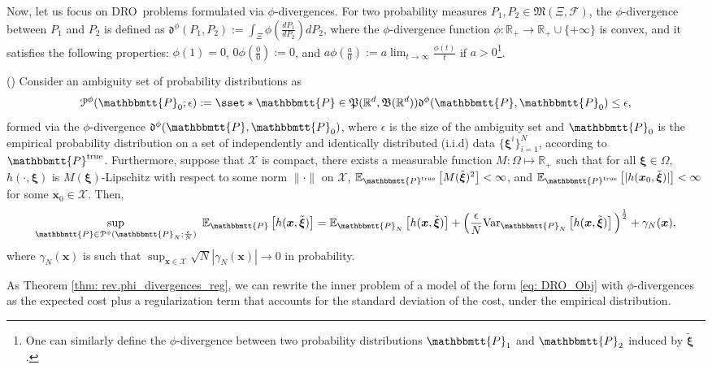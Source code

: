 \documentclass[final,onefignum,onetabnum]{class}
\newcommand{\ee}[2]{\mathbb{E}_{#1} \left[ #2 \right]}
\newcommand{\VVar}[2]{\mathrm{Var}_{#1} \left[ #2 \right]}
\newcommand{\bs}[1]{\boldsymbol{#1}} %
\newcommand{\Bs}[1]{\mathbb{#1}} %
\newcommand{\Ts}[1]{\mathbbmtt{#1}} %
\newcommand{\Cs}[1]{\mathcal{#1}} %
\newcommand{\Fs}[1]{\mathfrak{#1}} %
\newcommand{\txi}{\tilde{\bs{\xi}}}
\newcommand{\nomP}{\Ts{P}_{0}}
\newcommand{\trueP}{\Ts{P}^{\text{true}}}
\newcommand{\measurespace}{\left( \Xi, \Cs{F} \right)}
\renewcommand{\P}{\Fs{P}(\Bs{R}^{d},\Fs{B}(\Bs{R}^{d}))}
\newcommand{\dro}{DRO}
\begin{document}
Now, let us focus on \dro\ problems formulated via $\phi$-divergences. For two probability measures $P_{1}, P_{2} \in \Fs{M}\measurespace$, the $\phi$-divergence between $P_{1}$ and $P_{2}$ is defined as  $\Fs{d}^{\phi}(P_{1}, P_{2}):=\int_{\Xi}\phi\left(\frac{d P_{1}}{d P_{2}}\right) d P_{2}$, where the $\phi$-divergence function $\phi : \Bs{R}_{+} \rightarrow \Bs{R}_{+} \cup \{+ \infty\}$ is convex, and it satisfies the following properties: $\phi(1)=0$, $0\phi\left(\frac{0}{0}\right):=0$, and $a\phi\left(\frac{a}{0}\right):=a \lim_{t \rightarrow \infty} \frac{\phi(t)}{t}$ if $a>0$\footnote{One can similarly define the $\phi$-divergence between  two probability distributions $\Ts{P}_{1}$ and $\Ts{P}_{2}$ induced by $\txi$.}. 

\begin{theorem}{(\citet[Theorem~2]{duchi2016})}
     \label{thm: rev.phi_divergences_reg}
     Consider an ambiguity set of probability distributions as $$
        \Cs{P}^{\phi}(\nomP; \epsilon):= \sset*{\Ts{P} \in \P}{ \Fs{d}^{\phi}(\Ts{P},\nomP) \le \epsilon},$$
     formed via the $\phi$-divergence  $\Fs{d}^{\phi}(\Ts{P} ,\nomP)$, where $\epsilon$ is the size of the ambiguity set and $\nomP$ is the empirical probability distribution on a set of independently and identically distributed (i.i.d) data $\{\bs{\xi}^{i}\}_{i=1}^{N}$, according to $\trueP$.
     Furthermore, suppose that $\Cs{X}$ is compact, there exists a measurable function $M: \Omega \mapsto \Bs{R}_{+}$ such that for all $\bs{\xi} \in \Omega$, $h(\cdot, \bs{\xi})$ is $M(\bs{\xi})$-Lipschitz with respect to some norm $\|\cdot\|$ on $\Cs{X}$,  $\ee{\trueP}{M(\txi)^{2}}< \infty$, and $\ee{\trueP}{|h(\bs{x}_{0}, \txi)|}<\infty$ for some  $\bs{x}_{0} \in \Cs{X}$. 
     Then,   
     $$\sup_{\Ts{P} \in \Cs{P}^{\phi}(\Ts{P}_{N}; \frac{\epsilon}{N}) } \ \ee{\Ts{P}}{h(\bs{x},\txi)}= \ee{\Ts{P}_{N}}{h(\bs{x},\txi)}  + \Big( \frac{\epsilon}{N} \VVar{\Ts{P}_{N}}{h(\bs{x},\txi)} \Big)^{\frac{1}{2}}  + \gamma_{N}(\bs{x}),$$
     where $\gamma_{N}(\bs{x})$ is such that $\sup_{\bs{x} \in \Cs{X}}  \sqrt{N} |\gamma_{N}(\bs{x})| \rightarrow 0$ in probability. 
\end{theorem}

As Theorem \ref{thm: rev.phi_divergences_reg}, we can rewrite the inner problem of a model of the form \eqref{eq: DRO_Obj} with $\phi$-divergences as the expected cost  plus  a regularization term that accounts for the standard deviation of the cost, under the empirical distribution. 
\end{document}
